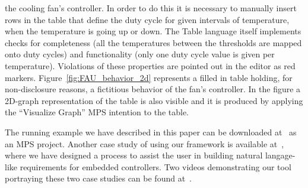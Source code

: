 the cooling fan's controller. In order to do this it is necessary to manually
insert rows in the table that define the duty cycle for given intervals of
temperature, when the temperature is going up or down.
The \textsf{Table} language itself implements checks for completeness (all the
temperatures between the thresholds are mapped onto duty cycles) and
functionality (only one duty cycle value is given per temperature). Violations
of these properties are pointed out in the editor as red markers.
Figure~\ref{fig:FAU_behavior_2d} represents a filled in table holding, for
non-disclosure reasons, a fictitious behavior of the fan's controller.
In the figure a 2D-graph representation of the table is also visible and it is
produced by applying the “Visualize Graph” MPS intention to the table.

The running example we have described in this paper can be downloaded
at~\cite{coolingControllerProcess} as an MPS project. Another case study of
using our framework is available at~\cite{earsctrlProcess}, where we have
designed a process to assist the user in building natural langage-like
requirements for embedded controllers. Two videos demonstrating our
tool portraying these two case studies can be found
at~\cite{coolingControllerProcessVideo,earsctrlProcessVideo}.
 \vspace{-.4cm}
  



